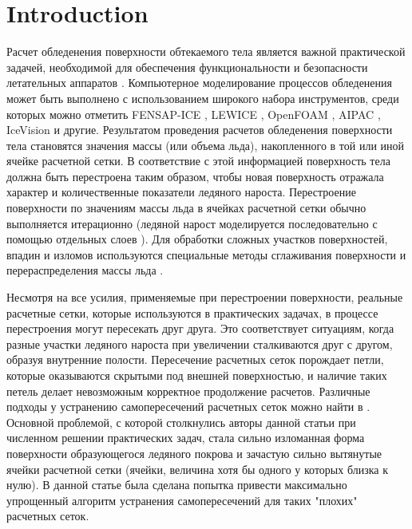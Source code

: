 \documentclass[
11pt,%
tightenlines,%
twoside,%
onecolumn,%
nofloats,%
nobibnotes,%
nofootinbib,%
superscriptaddress,%
noshowpacs,%
centertags]%
{revtex4}
\begin{document}
\maketitle

\section{Introduction}

Расчет обледенения поверхности обтекаемого тела является важной практической задачей, необходимой для обеспечения функциональности и безопасности летательных аппаратов \cite{Myers, Farzaneh, Dong, Beaugendre}.
Компьютерное моделирование процессов обледенения может быть выполнено с использованием широкого набора инструментов, среди которых можно отметить FENSAP-ICE \cite{Bourgault}, LEWICE \cite{Wright}, OpenFOAM \cite{Beld}, AIPAC \cite{Domingos}, IceVision \cite{Aksenov} и другие.
Результатом проведения расчетов обледенения поверхности тела становятся значения массы (или объема льда), накопленного в той или иной ячейке расчетной сетки.
В соответствие с этой информацией поверхность тела должна быть перестроена таким образом, чтобы новая поверхность отражала характер и количественные показатели ледяного нароста.
Перестроение поверхности по значениям массы льда в ячейках расчетной сетки обычно выполняется итерационно (ледяной нарост моделируется последовательно с помощью отдельных слоев \cite{BourgaultCote, Fortin}).
Для обработки сложных участков поверхностей, впадин и изломов используются специальные методы сглаживания поверхности и перераспределения массы льда \cite{Thompson, Tong}.

Несмотря на все усилия, применяемые при перестроении поверхности, реальные расчетные сетки, которые используются в практических задачах, в процессе перестроения могут пересекать друг друга.
Это соответствует ситуациям, когда разные участки ледяного нароста при увеличении сталкиваются друг с другом, образуя внутренние полости.
Пересечение расчетных сеток порождает петли, которые оказываются скрытыми под внешней поверхностью, и наличие таких петель делает невозможным корректное продолжение расчетов.
Различные подходы у устранению самопересечений расчетных сеток можно найти в \cite{Charton, Jung, Skorkovska}.
Основной проблемой, с которой столкнулись авторы данной статьи при численном решении практических задач, стала сильно изломанная форма поверхности образующегося ледяного покрова и зачастую сильно вытянутые ячейки расчетной сетки (ячейки, величина хотя бы одного у которых близка к нулю).
В данной статье была сделана попытка привести максимально упрощенный алгоритм устранения самопересечений для таких "плохих" расчетных сеток.
\end{document}
